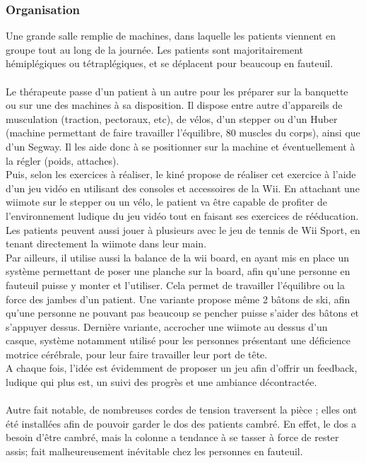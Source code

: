 	\subsubsection*{Organisation}
Une grande salle remplie de machines, dans laquelle les patients viennent en groupe tout au long de la journée. Les patients sont majoritairement hémiplégiques ou tétraplégiques, et se déplacent pour beaucoup en fauteuil.

\paragraph{}
Le thérapeute passe d'un patient à un autre pour les préparer sur la banquette ou sur une des machines à sa disposition. Il dispose entre autre d'appareils de musculation (traction, pectoraux, etc), de vélos, d'un stepper ou d'un Huber (machine permettant de faire travailler l'équilibre, 80 muscles du corps), ainsi que d'un Segway. Il les aide donc à se positionner sur la machine et éventuellement à la régler (poids, attaches).\\
Puis, selon les exercices à réaliser, le kiné propose de réaliser cet exercice à l'aide d'un jeu vidéo en utilisant des consoles et accessoires de la Wii. En attachant une wiimote sur le stepper ou un vélo, le patient va être capable de profiter de l'environnement ludique du jeu vidéo tout en faisant ses exercices de rééducation. Les patients peuvent aussi jouer à plusieurs avec le jeu de tennis de Wii Sport, en tenant directement la wiimote dans leur main.\\
Par ailleurs, il utilise aussi la balance de la wii board, en ayant mis en place un système permettant de poser une planche sur la board, afin qu'une personne en fauteuil puisse y monter et l'utiliser. Cela permet de travailler l'équilibre ou la force des jambes d'un patient. Une variante propose même 2 bâtons de ski, afin qu'une personne ne pouvant pas beaucoup se pencher puisse s'aider des bâtons et s'appuyer dessus. Dernière variante, accrocher une wiimote au dessus d'un casque, système notamment utilisé pour les personnes présentant une déficience motrice cérébrale, pour leur faire travailler leur port de tête.\\
A chaque fois, l'idée est évidemment de proposer un jeu afin d'offrir un feedback, ludique qui plus est, un suivi des progrès et une ambiance décontractée.

\paragraph{}Autre fait notable, de nombreuses cordes de tension traversent la pièce ; elles ont été installées afin de pouvoir garder le dos des patients cambré. En effet, le dos a besoin d'être cambré, mais la colonne a tendance à se tasser à force de rester assis; fait malheureusement inévitable chez les personnes en fauteuil.

